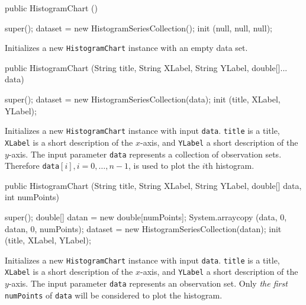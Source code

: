 \begin{code}
   public HistogramChart () \begin{hide} {
      super();
      dataset = new HistogramSeriesCollection();
      init (null, null, null);
   }\end{hide}
\end{code}
\begin{tabb}
   Initializes a new \texttt{HistogramChart} instance with an empty data set.
\end{tabb}
\begin{code}

   public HistogramChart (String title, String XLabel, String YLabel,
                          double[]... data) \begin{hide} {
      super();
      dataset = new HistogramSeriesCollection(data);
      init (title, XLabel, YLabel);
   }\end{hide}
\end{code}
\begin{tabb}
   Initializes a new \texttt{HistogramChart} instance with input \texttt{data}.
   \texttt{title} is a title, \texttt{XLabel} is a short description of
   the $x$-axis, and \texttt{YLabel} a short description of the $y$-axis.
   The input parameter \texttt{data} represents a collection of observation sets.
   Therefore \texttt{data}$[i], i = 0,\ldots,n-1$, is used to plot the
     $i$th histogram.
\end{tabb}
\begin{htmlonly}
\end{htmlonly}
\begin{code}

   public HistogramChart (String title, String XLabel, String YLabel,
                          double[] data, int numPoints) \begin{hide} {
      super();
      double[] datan = new double[numPoints];
      System.arraycopy (data, 0, datan, 0, numPoints);
      dataset = new HistogramSeriesCollection(datan);
      init (title, XLabel, YLabel);
   }\end{hide}
\end{code}
\begin{tabb}
   Initializes a new \texttt{HistogramChart} instance with input \texttt{data}.
   \texttt{title} is a title, \texttt{XLabel} is a short description of
   the $x$-axis, and \texttt{YLabel} a short description of the $y$-axis.
   The input parameter \texttt{data} represents an observation set.
  Only \emph{the first} \texttt{numPoints} of \texttt{data} will
  be considered to plot the histogram.
\end{tabb}
